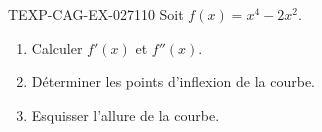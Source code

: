 \begin{exercice}{TEXP-CAG-EX-027}{1}{10}
Soit $f(x) = x^4 - 2x^2$.
\begin{enumerate}
  \item Calculer $f'(x)$ et $f''(x)$.
  \item Déterminer les points d'inflexion de la courbe.
  \item Esquisser l'allure de la courbe.
\end{enumerate}

\end{exercice}
